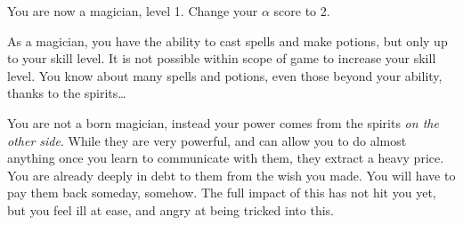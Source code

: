 \documentclass[green]{NeptuneBall}
\begin{document}
\name{\gSpirits{}}

You are now a magician, level 1. Change your $\alpha$ score to 2.

As a magician, you have the ability to cast spells and make potions, but only up to your skill level. It is not possible within scope of game to increase your skill level. You know about many spells and potions, even those beyond your ability, thanks to the spirits\ldots{}

You are not a born magician, instead your power comes from the spirits \emph{on the other side}. While they are very powerful, and can allow you to do almost anything once you  learn to communicate with them, they extract a heavy price. You are already deeply in debt to them from the wish you made. You will have to pay them back someday, somehow. The full impact of this has not hit you yet, but you feel ill at ease, and angry at being tricked into this.
\end{document}
